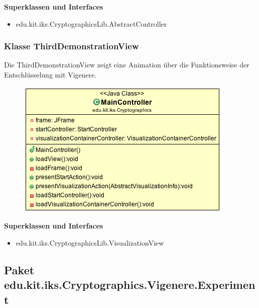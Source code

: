 \documentclass{article}
\begin{document}
      \textbf{Superklassen und Interfaces}
      \begin{itemize}
        \item edu.kit.iks.CryptographicsLib.AbstractController
      \end{itemize}

    \subsubsection{Klasse ThirdDemonstrationView}
      Die ThirdDemonstrationView zeigt eine Animation über die Funktionsweise der Entschlüsselung mit Vigenere.
      \begin{figure}[H]
        \centering
        \includegraphics[width=\textwidth]{resources/edu-kit-iks-Cryptographics-MainController}
      \end{figure}

      \textbf{Superklassen und Interfaces}
      \begin{itemize}
        \item edu.kit.iks.CryptographicsLib.VisualizationView
      \end{itemize}

  \subsection{Paket edu.kit.iks.Cryptographics.Vigenere.Experiment}
\end{document}
